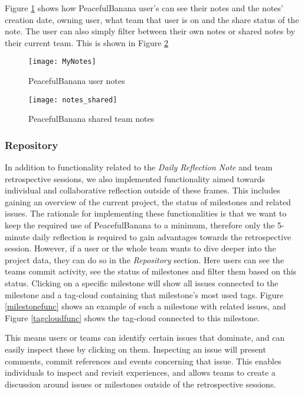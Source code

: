 Figure \ref{MyNotesFunc} shows how PeacefulBanana user's can see their notes and the notes' creation date, owning user, what team that user is on and the share status of the note. The user can also simply filter between their own notes or shared notes by their current team. This is shown in Figure \ref{notes_sharedfunc}
\begin{figure}[H]
    \centering
        \texttt{[image: MyNotes]}
    \caption{PeacefulBanana user notes}
    \label{MyNotesFunc}
\end{figure}
\begin{figure}[H]
    \centering
        \texttt{[image: notes\_shared]}
    \caption{PeacefulBanana shared team notes}
    \label{notes_sharedfunc}
\end{figure}

\subsubsection{Repository}
In addition to functionality related to the \emph{Daily Reflection Note} and team retrospective sessions, we also implemented functionality aimed towards individual and collaborative reflection outside of these frames. This includes gaining an overview of the current project, the status of milestones and related issues. The rationale for implementing these functionalities is that we want to keep the required use of PeacefulBanana to a minimum, therefore only the 5-minute daily reflection is required to gain advantages towards the retrospective session. However, if a user or the whole team wants to dive deeper into the project data, they can do so in the \emph{Repository} section. Here users can see the teams commit activity, see the status of milestones and filter them based on this status. Clicking on a specific milestone will show all issues connected to the milestone and a tag-cloud containing that milestone's most used tags. Figure \ref{milestonefunc} shows an example of such a milestone with related issues, and Figure \ref{tagcloudfunc} shows the tag-cloud connected to this milestone. 

This means users or teams can identify certain issues that dominate, and can easily inspect these by clicking on them. Inspecting an issue will present comments, commit references and events concerning that issue. This enables individuals to inspect and revisit experiences, and allows teams to create a discussion around issues or milestones outside of the retrospective sessions. 

